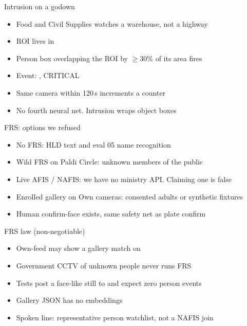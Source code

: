 \documentclass[aspectratio=169,11pt]{beamer}
\begin{document}
\begin{frame}{Intrusion on a godown}
\begin{itemize}\itemsep0.55em
\item Food and Civil Supplies watches a warehouse, not a highway
\item ROI lives in 
\item Person box overlapping the ROI by $\ge 30\%$ of its area fires
\item Event: , CRITICAL
\item Same camera within 120\,s increments a counter
\item No fourth neural net. Intrusion wraps object boxes
\end{itemize}
\end{frame}

\begin{frame}{FRS: options we refused}
\begin{itemize}\itemsep0.55em
\item No FRS: HLD text and eval 05 name recognition
\item Wild FRS on Paldi Circle: unknown members of the public
\item Live AFIS / NAFIS: we have no ministry API. Claiming one is false
\item Enrolled gallery on Own cameras: consented adults or synthetic fixtures
\item Human confirm-face exists, same safety net as plate confirm
\end{itemize}
\end{frame}

\begin{frame}{FRS law (non-negotiable)}
\begin{itemize}\itemsep0.55em
\item Own-feed may show a gallery match on 
\item Government CCTV of unknown people never runs FRS
\item Tests post a face-like still to  and expect zero person events
\item Gallery JSON has no embeddings
\item Spoken line: representative person watchlist, not a NAFIS join
\end{itemize}
\end{frame}
\end{document}
